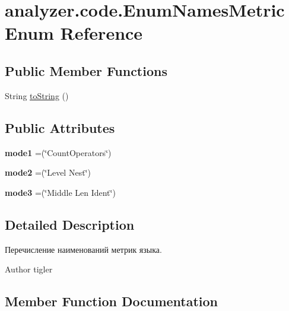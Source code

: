 \hypertarget{enumanalyzer_1_1code_1_1EnumNamesMetric}{}\section{analyzer.\+code.\+Enum\+Names\+Metric Enum Reference}
\label{enumanalyzer_1_1code_1_1EnumNamesMetric}
\subsection*{Public Member Functions}
\begin{DoxyCompactItemize}
\item 
String \hyperlink{enumanalyzer_1_1code_1_1EnumNamesMetric_a3ddc0d95ae5e93f08fa6273ea4c308a7}{to\+String} ()
\end{DoxyCompactItemize}
\subsection*{Public Attributes}
\begin{DoxyCompactItemize}
\item 
\mbox{\label{enumanalyzer_1_1code_1_1EnumNamesMetric_a492e123ac37a4cfcc15c7ac62be6faed}} 
{\bfseries mode1} =(\char`\"{}Count\+Operators\char`\"{})
\item 
\mbox{\label{enumanalyzer_1_1code_1_1EnumNamesMetric_a8a20b91930a031b90ce4c002e1304243}} 
{\bfseries mode2} =(\char`\"{}Level Nest\char`\"{})
\item 
\mbox{\label{enumanalyzer_1_1code_1_1EnumNamesMetric_ab414c78a055b8758e2998a7f5c38dd57}} 
{\bfseries mode3} =(\char`\"{}Middle Len Ident\char`\"{})
\end{DoxyCompactItemize}


\subsection{Detailed Description}
Перечисление наименований метрик языка. \begin{DoxyAuthor}{Author}
tigler 
\end{DoxyAuthor}


\subsection{Member Function Documentation}
\mbox{\label{enumanalyzer_1_1code_1_1EnumNamesMetric_a3ddc0d95ae5e93f08fa6273ea4c308a7}} 
